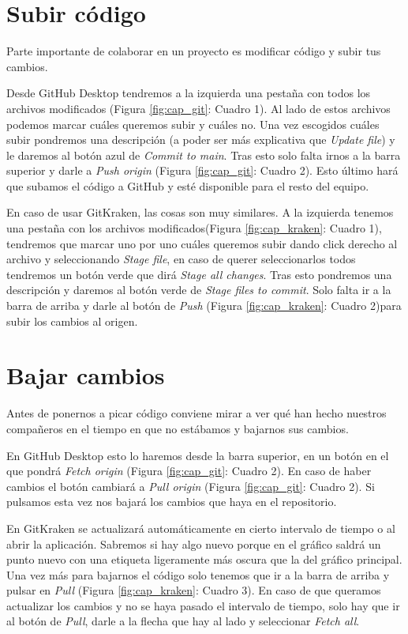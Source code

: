 \section{Subir código}

Parte importante de colaborar en un proyecto es modificar código y subir tus cambios.

Desde GitHub Desktop tendremos a la izquierda una pestaña con todos los archivos modificados (Figura \ref{fig:cap_git}: Cuadro 1). Al lado de estos archivos podemos marcar cuáles queremos subir y cuáles no.
Una vez escogidos cuáles subir pondremos una descripción (a poder ser más explicativa que \textit{Update file}) y le daremos al botón azul de \textit{Commit to main}. Tras esto solo falta irnos a la barra superior y darle a \textit{Push origin} (Figura \ref{fig:cap_git}: Cuadro 2). Esto último hará que subamos el código a GitHub y esté disponible para el resto del equipo.

En caso de usar GitKraken, las cosas son muy similares. A la izquierda tenemos una pestaña con los archivos modificados(Figura \ref{fig:cap_kraken}: Cuadro 1), tendremos que marcar uno por uno cuáles queremos subir dando click derecho al archivo y seleccionando \textit{Stage file}, en caso de querer seleccionarlos todos tendremos un botón verde que dirá \textit{Stage all changes}.
Tras esto pondremos una descripción y daremos al botón verde de \textit{Stage files to commit}. Solo falta ir a la barra de arriba y darle al botón de \textit{Push} (Figura \ref{fig:cap_kraken}: Cuadro 2)para subir los cambios al origen.

\section{Bajar cambios}

Antes de ponernos a picar código conviene mirar a ver qué han hecho nuestros compañeros en el tiempo en que no estábamos y bajarnos sus cambios.

En GitHub Desktop esto lo haremos desde la barra superior, en un botón en el que pondrá \textit{Fetch origin} (Figura \ref{fig:cap_git}: Cuadro 2). En caso de haber cambios el botón cambiará a \textit{Pull origin} (Figura \ref{fig:cap_git}: Cuadro 2). Si pulsamos esta vez nos bajará los cambios que haya en el repositorio.

En GitKraken se actualizará automáticamente en cierto intervalo de tiempo o al abrir la aplicación. Sabremos si hay algo nuevo porque en el gráfico saldrá un punto nuevo con una etiqueta ligeramente más oscura que la del gráfico principal. Una vez más para bajarnos el código solo tenemos que ir a la barra de arriba y pulsar en \textit{Pull} (Figura \ref{fig:cap_kraken}: Cuadro 3). En caso de que queramos actualizar los cambios y no se haya pasado el intervalo de tiempo, solo hay que ir al botón  de \textit{Pull}, darle a la flecha que hay al lado y seleccionar \textit{Fetch all}.

